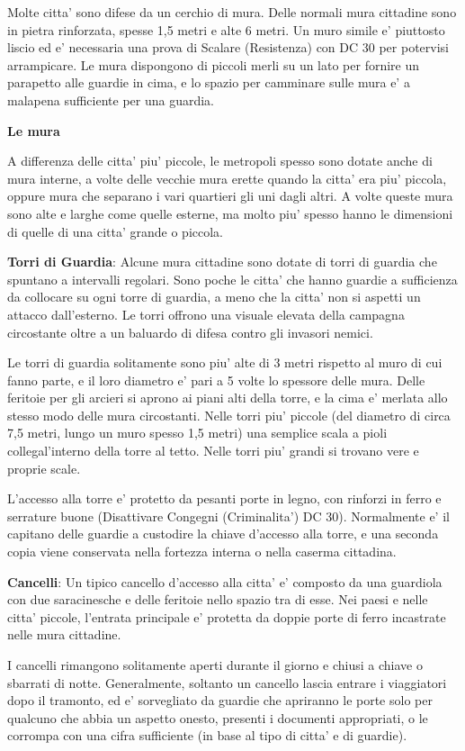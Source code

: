 \documentclass[a4paper,11pt,twoside,openany]{book}
\begin{document}
{Molte citta' sono difese da un cerchio di mura. Delle normali mura cittadine sono in pietra rinforzata, spesse 1,5 metri e alte 6 metri. Un muro simile e' piuttosto liscio ed e' necessaria una prova di Scalare (Resistenza) con DC 30 per potervisi arrampicare. Le mura dispongono di piccoli merli su un lato per fornire un parapetto alle guardie in cima, e lo spazio per camminare sulle mura e' a malapena sufficiente per una guardia.

\textbf{Le mura}

A differenza delle citta' piu' piccole, le metropoli spesso sono dotate anche di mura interne, a volte delle vecchie mura erette quando la citta' era piu' piccola, oppure mura che separano i vari quartieri gli uni dagli altri. A volte queste mura sono alte e larghe come quelle esterne, ma molto piu' spesso hanno le dimensioni di quelle di una citta' grande o piccola.

\textbf{Torri di Guardia}: Alcune mura cittadine sono dotate di torri di guardia che spuntano a intervalli regolari. Sono poche le citta' che hanno guardie a sufficienza da collocare su ogni torre di guardia, a meno che la citta' non si aspetti un attacco dall'esterno. Le torri offrono una visuale elevata della campagna circostante oltre a un baluardo di difesa contro gli invasori nemici.

Le torri di guardia solitamente sono piu' alte di 3 metri rispetto al muro di cui fanno parte, e il loro diametro e' pari a 5 volte lo spessore delle mura. Delle feritoie per gli arcieri si aprono ai piani alti della torre, e la cima e' merlata allo stesso modo delle mura circostanti. Nelle torri piu' piccole (del diametro di circa 7,5 metri, lungo un muro spesso 1,5 metri) una semplice scala a pioli collegal'interno della torre al tetto. Nelle torri piu' grandi si trovano vere e proprie scale.

L'accesso alla torre e' protetto da pesanti porte in legno, con rinforzi in ferro e serrature buone (Disattivare Congegni (Criminalita') DC 30). Normalmente e' il capitano delle guardie a custodire la chiave d'accesso alla torre, e una seconda copia viene conservata nella fortezza interna o nella caserma cittadina.

\textbf{Cancelli}: Un tipico cancello d'accesso alla citta' e' composto da una guardiola con due saracinesche e delle feritoie nello spazio tra di esse. Nei paesi e nelle citta' piccole, l'entrata principale e' protetta da doppie porte di ferro incastrate nelle mura cittadine.

I cancelli rimangono solitamente aperti durante il giorno e chiusi a chiave o sbarrati di notte. Generalmente, soltanto un cancello lascia entrare i viaggiatori dopo il tramonto, ed e' sorvegliato da guardie che apriranno le porte solo per qualcuno che abbia un aspetto onesto, presenti i documenti appropriati, o le corrompa con una cifra sufficiente (in base al tipo di citta' e di guardie).

}
\end{document}
